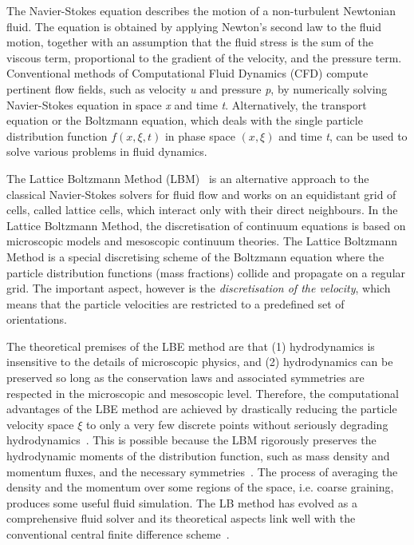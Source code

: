 The Navier-Stokes equation describes the motion of a non-turbulent Newtonian 
fluid. The equation is obtained by applying Newton's second law to the fluid
motion, together with an assumption that the fluid stress is the sum of the 
viscous term, proportional to the gradient of the velocity, and the pressure 
term. Conventional methods of Computational Fluid Dynamics (CFD) compute 
pertinent flow fields, such as velocity \textit{u} and pressure \textit{p}, by 
numerically solving Navier-Stokes equation in space \textit{x} and time 
\textit{t}. Alternatively, the transport equation or the Boltzmann equation, 
which deals with the single particle distribution function $f(x,\xi,t)$ in 
phase space $(x,\xi)$ and time \textit{t}, can be used to solve various 
problems in fluid dynamics. 

The Lattice Boltzmann Method
(LBM)~\citep{He1997a,He1997b,Chen1998a,Mei2000,Han2007a,Zhou2012} is an
alternative approach to the classical Navier-Stokes solvers for fluid flow and 
works on an equidistant grid of cells, called lattice cells, which interact 
only with their direct neighbours. In the Lattice Boltzmann Method, the 
discretisation of continuum equations is based on microscopic models and 
mesoscopic continuum theories. The Lattice Boltzmann Method is a special 
discretising scheme of the Boltzmann equation where the particle distribution 
functions (mass fractions) collide and propagate on a regular grid. The 
important aspect, however is the \textit{discretisation of the velocity}, which 
means that the particle velocities are restricted to a predefined set of 
orientations.

The theoretical premises of the LBE method are that (1) hydrodynamics is 
insensitive to the details of microscopic physics, and (2) hydrodynamics can be 
preserved so long as the conservation laws and associated symmetries are 
respected in the microscopic and mesoscopic level. Therefore, the computational 
advantages of the LBE method are achieved by drastically reducing the particle 
velocity space $\xi$ to only a very few discrete points without seriously 
degrading hydrodynamics~\citep{Mei2000}. This is possible because the LBM 
rigorously preserves the hydrodynamic moments of the distribution function, 
such as mass density and momentum fluxes, and the necessary 
symmetries~\citep{He1997a,He1997b}. The process of averaging the density and 
the momentum over some regions of the space, i.e. coarse graining, produces 
some useful fluid simulation. The LB method has evolved as a comprehensive 
fluid solver and its theoretical aspects link well with the conventional 
central finite difference scheme~\citep{Cook2004}.

